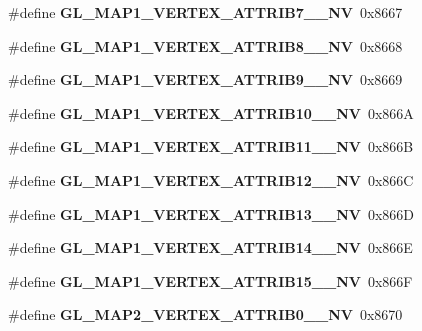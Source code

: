 \begin{DoxyCompactItemize}
\item 
\#define {\bfseries G\+L\+\_\+\+M\+A\+P1\+\_\+\+V\+E\+R\+T\+E\+X\+\_\+\+A\+T\+T\+R\+I\+B7\+\_\+\_\+\+N\+V}~0x8667\label{_s_d_l__opengl_8h_a7ca5ae2e8113e7781a3f28305aead191}

\item 
\#define {\bfseries G\+L\+\_\+\+M\+A\+P1\+\_\+\+V\+E\+R\+T\+E\+X\+\_\+\+A\+T\+T\+R\+I\+B8\+\_\+\_\+\+N\+V}~0x8668\label{_s_d_l__opengl_8h_a3b414212d6fa089193b8f7c7d23c00b5}

\item 
\#define {\bfseries G\+L\+\_\+\+M\+A\+P1\+\_\+\+V\+E\+R\+T\+E\+X\+\_\+\+A\+T\+T\+R\+I\+B9\+\_\+\_\+\+N\+V}~0x8669\label{_s_d_l__opengl_8h_a6bc2e1241dcf64a4cb0c8f46d528f59d}

\item 
\#define {\bfseries G\+L\+\_\+\+M\+A\+P1\+\_\+\+V\+E\+R\+T\+E\+X\+\_\+\+A\+T\+T\+R\+I\+B10\+\_\+\_\+\+N\+V}~0x866\+A\label{_s_d_l__opengl_8h_aa6cadd8e9259c24940458ac74be636e5}

\item 
\#define {\bfseries G\+L\+\_\+\+M\+A\+P1\+\_\+\+V\+E\+R\+T\+E\+X\+\_\+\+A\+T\+T\+R\+I\+B11\+\_\+\_\+\+N\+V}~0x866\+B\label{_s_d_l__opengl_8h_a28fb0a7695ec0ba03a24103d8c00f5e5}

\item 
\#define {\bfseries G\+L\+\_\+\+M\+A\+P1\+\_\+\+V\+E\+R\+T\+E\+X\+\_\+\+A\+T\+T\+R\+I\+B12\+\_\+\_\+\+N\+V}~0x866\+C\label{_s_d_l__opengl_8h_ae34201c834d691412c8ea7b97659b331}

\item 
\#define {\bfseries G\+L\+\_\+\+M\+A\+P1\+\_\+\+V\+E\+R\+T\+E\+X\+\_\+\+A\+T\+T\+R\+I\+B13\+\_\+\_\+\+N\+V}~0x866\+D\label{_s_d_l__opengl_8h_a163f00fdaf297768bd4a92a50c53d782}

\item 
\#define {\bfseries G\+L\+\_\+\+M\+A\+P1\+\_\+\+V\+E\+R\+T\+E\+X\+\_\+\+A\+T\+T\+R\+I\+B14\+\_\+\_\+\+N\+V}~0x866\+E\label{_s_d_l__opengl_8h_acfcfd02a67755dc57789960ad4fa4ad8}

\item 
\#define {\bfseries G\+L\+\_\+\+M\+A\+P1\+\_\+\+V\+E\+R\+T\+E\+X\+\_\+\+A\+T\+T\+R\+I\+B15\+\_\+\_\+\+N\+V}~0x866\+F\label{_s_d_l__opengl_8h_a42d4b8efdf7f2127f7b4cbda1c98cf62}

\item 
\#define {\bfseries G\+L\+\_\+\+M\+A\+P2\+\_\+\+V\+E\+R\+T\+E\+X\+\_\+\+A\+T\+T\+R\+I\+B0\+\_\+\_\+\+N\+V}~0x8670\label{_s_d_l__opengl_8h_a88a130b8af32cea0734636d9c7079759}


\end{DoxyCompactItemize}
